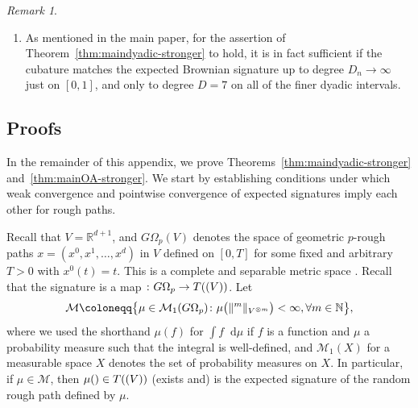 \documentclass[11pt, letterpaper]{article}
\let\sig\relax
\DeclareMathOperator{\sig}{S}
\theoremstyle{definition}
\theoremstyle{remark}
\newtheorem{remark}{Remark}
\newcommand{\R}{\mathbb{R}}
\newcommand{\N}{\mathbb{N}}
\newcommand{\diff}{\mathop{}\!\mathrm{d}}
\begin{document}
\begin{appendices}
\begin{remark}
\begin{enumerate}
        \item[(ii)] As mentioned in the main paper, for the assertion of Theorem~\ref{thm:maindyadic-stronger} to hold, it is in fact sufficient if the cubature matches the expected Brownian signature up to degree $D_n \to \infty$ just on $[0,1]$, and only to degree $D=7$ on all of the finer dyadic intervals.
    \end{enumerate}
\end{remark}

\subsection{Proofs}
In the remainder of this appendix, we prove Theorems~\ref{thm:maindyadic-stronger} and~\ref{thm:mainOA-stronger}. 
We start by establishing conditions under which weak convergence and pointwise convergence of expected signatures imply each other for rough paths.

Recall that $V = \R^{d+1}$, and $G\Omega_p(V)$ denotes the space of geometric $p$-rough paths $x=(x^0,x^1,\ldots,x^d)$ in $V$ defined on $[0,T]$ for some fixed and arbitrary $T > 0$ with $x^0(t) = t$. This is a complete and separable metric space \cite[Proposition 39]{chevyrev2022signature}. Recall that the signature is a map $\sig \colon G\Omega_p \to T((V))$.
Let \[
\mathcal{M} \coloneqq \big\{\mu \in \mathcal{M}_1(G\Omega_p)\colon \mu\big( \|\sig^m\|_{V^{\otimes m}}\big) < \infty, \forall m\in \N \big\},
\]
where we used the shorthand $\mu(f)$ for $\int f \diff \mu$ if $f$ is a function and $\mu$ a probability measure such that the integral is well-defined, and $\mathcal{M}_1(X)$ for a measurable space $X$ denotes the set of probability measures on $X$. In particular, if $\mu \in \mathcal{M}$, then $\mu(\sig) \in T((V))$ (exists and) is the expected signature of the random rough path defined by $\mu$.


\end{appendices}
\end{document}
